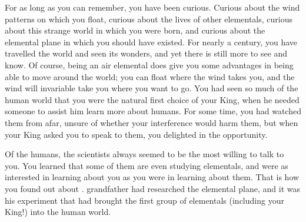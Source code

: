\documentclass[char]{elementals}
\begin{document}
\name{\cNaturalist{}}

For as long as you can remember, you have been curious.  Curious about the wind patterns on which you float, curious about the lives of other elementals, curious about this strange world in which you were born, and curious about the elemental plane in which you should have existed.  For nearly a century, you have travelled the world and seen its wonders, and yet there is still more to see and know.  Of course, being an air elemental does give you some advantages in being able to move around the world; you can float where the wind takes you, and the wind will invariable take you where you want to go.  You had seen so much of the human world that you were the natural first choice of your King, \cKing{\intro} when he needed someone to assist him learn more about humans.  For some time, you had watched them from afar, unsure of whether your interference would harm them, but when your King asked you to speak to them, you delighted in the opportunity.


Of the humans, the scientists always seemed to be the most willing to talk to you.  You learned that some of them are even studying elementals, and were as interested in learning about you as you were in learning about them.  That is how you found out about \cGD{\intro}.  \cGD{\Their} grandfather had researched the elemental plane, and it was his experiment that had brought the first group of elementals (including your King!) into the human world.  

\end{document}
